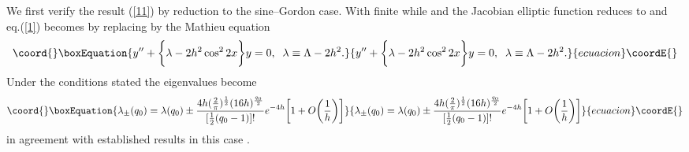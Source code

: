 \documentclass[a4paper,12pt,a4]{article}
\begin{document}
We first verify the result (\ref{11}) by reduction to the sine--Gordon
case. With \coordHE{} finite
 while \coordHE{} and \coordHE{}
the Jacobian elliptic function \coordHE{} reduces to \coordHE{} 
and eq.(\ref{1}) becomes by replacing \coordHE{} by \coordHE{}
the Mathieu equation
\begin{equation}\coord{}\boxEquation{
y^{\prime\prime}+\bigg\{\lambda-2h^2\cos^2 2x\bigg\}y=0,
\;\; \lambda\equiv \Lambda-2h^2.
\label{12}
}{
y^{\prime\prime}+\bigg\{\lambda-2h^2\cos^2 2x\bigg\}y=0,
\;\; \lambda\equiv \Lambda-2h^2.
}{ecuacion}\coordE{}\end{equation}
Under the conditions stated the eigenvalues become
\begin{equation}\coord{}\boxEquation{
\lambda_{\pm}(q_0) 
=\lambda(q_0)
\pm\frac{4h(\frac{2}{\pi})^{\frac{1}{2}}(16h)^{\frac{q_0}{2}}}
{[\frac{1}{2}(q_0-1)]!}e^{-4h}\bigg[1+O\bigg(\frac{1}{h}\bigg)\bigg]
\label{13}
}{
\lambda_{\pm}(q_0) 
=\lambda(q_0)
\pm\frac{4h(\frac{2}{\pi})^{\frac{1}{2}}(16h)^{\frac{q_0}{2}}}
{[\frac{1}{2}(q_0-1)]!}e^{-4h}\bigg[1+O\bigg(\frac{1}{h}\bigg)\bigg]
}{ecuacion}\coordE{}\end{equation}
in agreement with established results in this case \cite{9,10,11}. 

\vspace{0.2cm}
\end{document}
